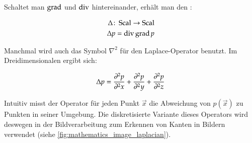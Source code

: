 Schaltet man $\operatorname*{grad}$ und $\operatorname*{div}$ hintereinander, erhält man den
:

\begin{equation}
\begin{aligned}
\Delta \colon \operatorname*{Scal} \to \operatorname*{Scal} \\
\Delta p = \operatorname*{div} \operatorname*{grad} p
\end{aligned}
\end{equation}

Manchmal wird auch das Symbol $\nabla^2$ für den Laplace-Operator benutzt. Im Dreidimensionalen ergibt sich:

\begin{equation}
\Delta p =
\frac{\partial^2 p}{\partial^2 x} +
\frac{\partial^2 p}{\partial^2 y} +
\frac{\partial^2 p}{\partial^2 z}
\end{equation}

Intuitiv misst der Operator für jeden Punkt $\vec{x}$ die Abweichung von
$p(\vec{x})$ zu Punkten in seiner Umgebung. Die diskretisierte Variante dieses
Operators wird deswegen in der Bildverarbeitung zum Erkennen von Kanten in
Bildern verwendet (siehe \autoref{fig:mathematics_image_laplacian}).


